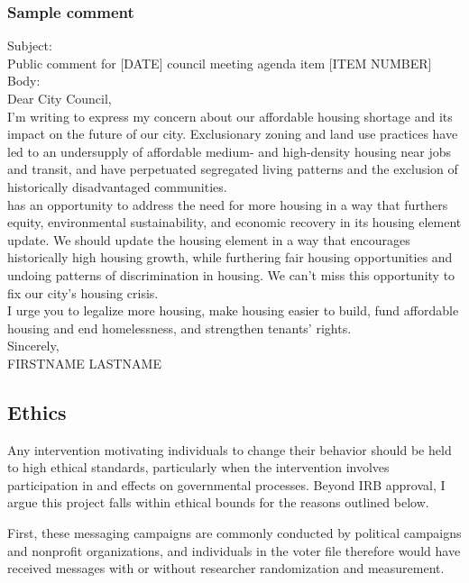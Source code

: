 \documentclass[12pt,final,fleqn]{article}
\theoremstyle{plain}
\begin{document}
\pagebreak
\subsubsection{Sample comment} \label{sec: sample_comment}
\noindent
Subject: \\
\noindent
Public comment for [DATE] council meeting agenda item [ITEM NUMBER] \\

\noindent
Body: \\
\noindent
Dear City Council, \\

\noindent
I’m writing to express my concern about our affordable housing shortage and its impact on the future of our city. Exclusionary zoning and land use practices have led to an undersupply of affordable medium- and high-density housing near jobs and transit, and have perpetuated segregated living patterns and the exclusion of historically disadvantaged communities. \\

\noindent
[CITY] has an opportunity to address the need for more housing in a way that furthers equity, environmental sustainability, and economic recovery in its housing element update. We should update the housing element in a way that encourages historically high housing growth, while furthering fair housing opportunities and undoing patterns of discrimination in housing. We can’t miss this opportunity to fix our city’s housing crisis. \\

\noindent
I urge you to legalize more housing, make housing easier to build, fund affordable housing and end homelessness, and strengthen tenants’ rights. \\

\noindent
Sincerely, \\
\noindent
FIRSTNAME LASTNAME

\pagebreak
\subsection{Ethics} \label{sec: ethics}

Any intervention motivating individuals to change their behavior should be held to high ethical standards, particularly when the intervention involves participation in and effects on governmental processes. Beyond IRB approval, I argue this project falls within ethical bounds for the reasons outlined below. 

First, these messaging campaigns are commonly conducted by political campaigns and nonprofit organizations, and individuals in the voter file therefore would have received messages with or without researcher randomization and measurement. 
\end{document}

